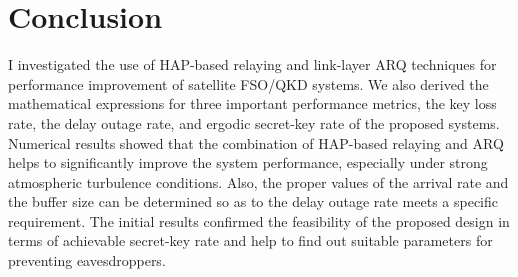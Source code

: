 \documentclass[conference]{IEEEtran}
\begin{document}
\section{Conclusion}\label{sect:Conclusion}
I investigated the use of HAP-based relaying and link-layer ARQ techniques for performance improvement of satellite FSO/QKD systems. We also derived the mathematical expressions for three important performance metrics, the key loss rate, the delay outage rate, and ergodic secret-key rate of the proposed systems. Numerical results showed that the combination of HAP-based relaying and ARQ helps to significantly improve the system performance, especially under strong atmospheric turbulence conditions. Also, the proper values of the arrival rate and the buffer size can be determined so as to the delay outage rate meets a specific requirement. The initial results confirmed the feasibility of  the proposed design in terms of achievable secret-key rate and help to find out suitable parameters for preventing eavesdroppers.
\end{document}
